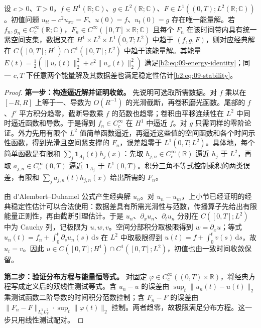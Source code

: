 \begin{theorem}[能量极限]\label{b2:thm:09-energy-solution}
设 \(c>0\)、\(T>0\)，\(f\in H^1(\mathbb R;\mathbb C)\)、\(g\in L^2(\mathbb R;\mathbb C)\)、\(F\in L^1((0,T);L^2(\mathbb R;\mathbb C))\)。初值问题 \(u_{tt}-c^2u_{xx}=F\)、\(u(0)=f\)、\(u_t(0)=g\) 存在唯一能量解。若 \(f_n,g_n\in C_c^\infty(\mathbb R;\mathbb C)\)，\(F_n\in C^\infty([0,T]\times\mathbb R;\mathbb C)\) 且每个 \(F_n\) 在该时间带内具有统一紧空间支集，数据又在 \(H^1\times L^2\times L^1(0,T;L^2)\) 中趋于 \((f,g,F)\)，则对应经典解在 \(C([0,T];H^1)\cap C^1([0,T];L^2)\) 中趋于该能量解。其能量 \(E(t)=\frac12(\|u_t(t)\|_2^2+c^2\|u_x(t)\|_2^2)\) 满足\eqref{b2:eq:09-energy-identity}；同一 \(c,T\) 下任意两个能量解及其数据差也满足稳定性估计\eqref{b2:eq:09-stability}。
\end{theorem}
\begin{proof}
\textbf{第一步：构造逼近解并证明收敛。}
先说明可选取所需数据。对 \(f\) 乘以在 \([-R,R]\) 上等于一、导数为 \(O(R^{-1})\) 的光滑截断，再卷积磨光函数。尾部的 \(f\)、\(f'\) 平方积分趋零，截断导数乘 \(f\) 的范数也趋零；卷积由平移连续性在 \(L^2\) 中同时逼近函数和导数。于是得到 \(f_n\in C_c^\infty\) 在 \(H^1\) 中逼近 \(f\)。对 \(g\) 只需同样的零阶论证。外力先用有限个 \(L^2\) 值简单函数逼近，再逼近这些值的空间函数和各个时间示性函数，得到光滑且空间紧支撑的 \(F_n\)，误差趋零于 \(L^1(0,T;L^2)\)。具体地，每个简单函数是有限和 \(\sum_j\mathbf1_{A_j}(t)h_j(x)\)：先取 \(h_{j,n}\in C_c^\infty(\mathbb R)\) 逼近 \(h_j\) 于 \(L^2\)，再取 \(a_{j,n}\in C_c^\infty(0,T)\) 逼近 \(\mathbf1_{A_j}\) 于 \(L^1(0,T)\)。积分三角不等式控制乘积的两类误差，有限和 \(\sum_ja_{j,n}(t)h_{j,n}(x)\) 给出所需的 \(F_n\)。

由 d'Alembert--Duhamel 公式产生经典解 \(u_n\)。对 \(u_n-u_m\)，上小节已经证明的经典稳定性估计可以合法使用：数据差具有所需光滑性与范数，传播算子先给出有限能量正则性，再由截断引理估计。于是 \(u_n\)、\(\partial_xu_n\)、\(\partial_tu_n\) 分别在 \(C([0,T];L^2)\) 中为 Cauchy 列，记极限为 \(u,w,v\)。空间分部积分取极限得到 \(w=\partial_xu\)；等式 \(u_n(t)=f_n+\int_0^t\partial_su_n(s)\,\mathrm{d}s\) 在 \(L^2\) 中取极限得到 \(u(t)=f+\int_0^tv(s)\,\mathrm{d}s\)，故 \(u_t=v\)。因此 \(u\in C([0,T];H^1)\cap C^1([0,T];L^2)\)，初值也由一致时间收敛保留。

\textbf{第二步：验证分布方程与能量恒等式。}
对固定 \(\varphi\in C_c^\infty((0,T)\times\mathbb R)\)，将经典方程写成定义后的双线性测试等式。含 \(u_n-u\) 的误差由 \(\sup_t\|u_n(t)-u(t)\|_2\) 乘测试函数二阶导数的时间积分范数控制；含 \(F_n-F\) 的误差由 \(\|F_n-F\|_{L^1_tL^2_x}\cdot\sup_t\|\varphi(t)\|_2\) 控制。两者趋零，故极限满足分布方程。这一步只用线性测试配对。


\end{proof}
